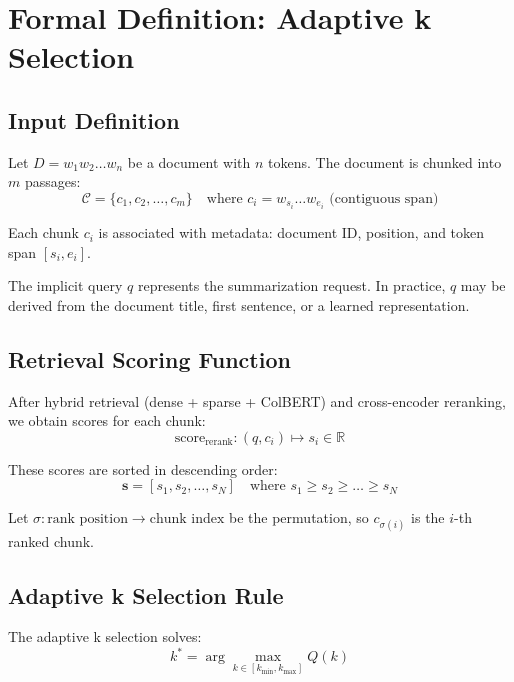 \section*{Formal Definition: Adaptive k Selection}
\label{sec:adaptive_k_formal}

\subsection*{Input Definition}

Let $D = w_1 w_2 \ldots w_n$ be a document with $n$ tokens. The document is chunked into $m$ passages:
\begin{equation}
\mathcal{C} = \{c_1, c_2, \ldots, c_m\} \quad \text{where } c_i = w_{s_i} \ldots w_{e_i} \text{ (contiguous span)}
\end{equation}

Each chunk $c_i$ is associated with metadata: document ID, position, and token span $[s_i, e_i]$.

The implicit query $q$ represents the summarization request. In practice, $q$ may be derived from the document title, first sentence, or a learned representation.

\subsection*{Retrieval Scoring Function}

After hybrid retrieval (dense + sparse + ColBERT) and cross-encoder reranking, we obtain scores for each chunk:
\begin{equation}
\text{score}_{\text{rerank}} : (q, c_i) \mapsto s_i \in \mathbb{R}
\end{equation}

These scores are sorted in descending order:
\begin{equation}
\mathbf{s} = [s_1, s_2, \ldots, s_N] \quad \text{where } s_1 \geq s_2 \geq \ldots \geq s_N
\end{equation}

Let $\sigma: \text{rank position} \to \text{chunk index}$ be the permutation, so $c_{\sigma(i)}$ is the $i$-th ranked chunk.

\subsection*{Adaptive k Selection Rule}

The adaptive k selection solves:
\begin{equation}
k^* = \arg\max_{k \in [k_{\min}, k_{\max}]} Q(k)
\end{equation}


